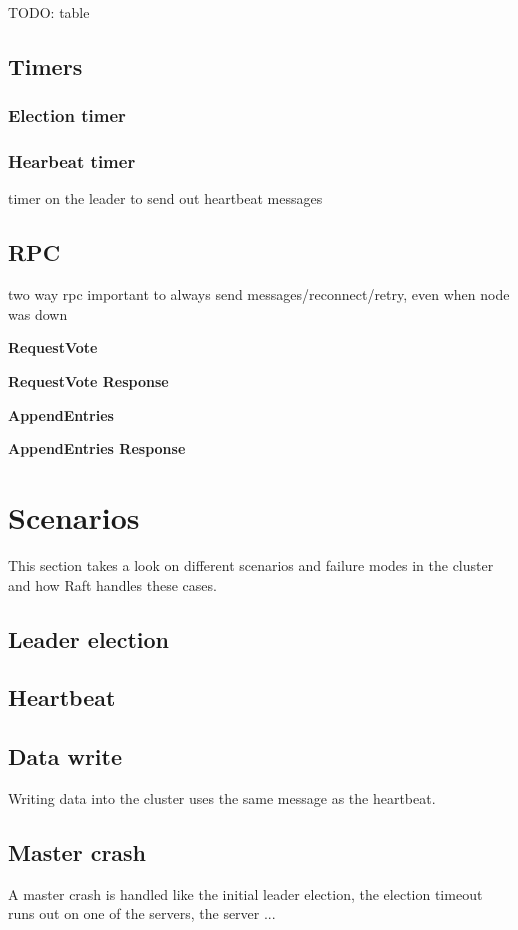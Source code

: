 TODO: table


\subsection{Timers}

\subsubsection*{Election timer}

\subsubsection*{Hearbeat timer}
timer on the leader to send out heartbeat messages

\subsection{RPC}

two way rpc
important to always send messages/reconnect/retry, even when node was down

\textbf{RequestVote}

\textbf{RequestVote Response}

\textbf{AppendEntries}

\textbf{AppendEntries Response}

\section{Scenarios}
This section takes a look on different scenarios and failure modes in the cluster and how Raft handles these cases.

\subsection{Leader election}

\subsection{Heartbeat}

\subsection{Data write}
Writing data into the cluster uses the same message as the heartbeat.


\subsection{Master crash}
A master crash is handled like the initial leader election, the election timeout runs out on one of the servers, the server ...

